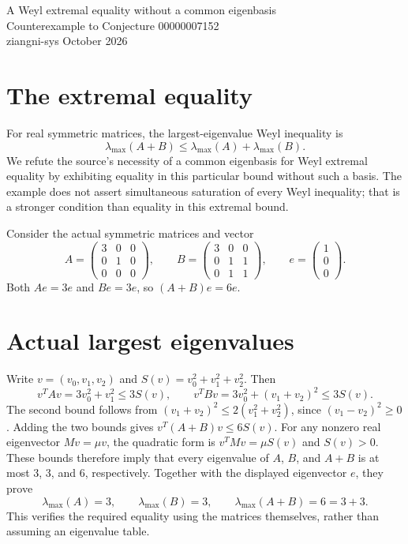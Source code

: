 \documentclass[10pt,a4paper]{article}
\begin{document}
\begin{center}
{\Large A Weyl extremal equality without a common eigenbasis}\\[4pt]
{\large Counterexample to Conjecture 00000007152}\\[6pt]
ziangni-sys  October 2026
\end{center}

\section*{The extremal equality}
For real symmetric matrices, the largest-eigenvalue Weyl inequality is
\[
\lambda_{\max}(A+B)\leq\lambda_{\max}(A)+\lambda_{\max}(B).
\]
We refute the source's necessity of a common eigenbasis for Weyl extremal
equality by exhibiting equality in this particular bound without such
a basis. The example does not assert simultaneous saturation of every
Weyl inequality; that is a stronger condition than equality in this
extremal bound.

Consider the actual symmetric matrices and vector
\[
A=\begin{pmatrix}3&0&0\\0&1&0\\0&0&0\end{pmatrix},\qquad
B=\begin{pmatrix}3&0&0\\0&1&1\\0&1&1\end{pmatrix},\qquad
e=\begin{pmatrix}1\\0\\0\end{pmatrix}.
\]
Both $Ae=3e$ and $Be=3e$, so $(A+B)e=6e$.

\section*{Actual largest eigenvalues}
Write $v=(v_0,v_1,v_2)$ and $S(v)=v_0^2+v_1^2+v_2^2$.
Then
\[
v^TAv=3v_0^2+v_1^2\leq3S(v),\qquad
v^TBv=3v_0^2+(v_1+v_2)^2\leq3S(v).
\]
The second bound follows from
$(v_1+v_2)^2\leq2(v_1^2+v_2^2)$, since $(v_1-v_2)^2\geq0$.
Adding the two bounds gives $v^T(A+B)v\leq6S(v)$.
For any nonzero real eigenvector $Mv=\mu v$, the quadratic form is
$v^TMv=\mu S(v)$ and $S(v)>0$. These bounds therefore imply that
every eigenvalue of $A$, $B$, and $A+B$ is at most $3$, $3$, and $6$,
respectively. Together with the displayed eigenvector $e$, they prove
\[
\lambda_{\max}(A)=3,\qquad\lambda_{\max}(B)=3,\qquad
\lambda_{\max}(A+B)=6=3+3.
\]
This verifies the required equality using the matrices themselves,
rather than assuming an eigenvalue table.
\end{document}
